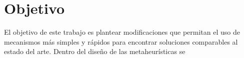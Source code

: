 \section{Objetivo}

El objetivo de este trabajo es plantear modificaciones que permitan el uso de mecanismos más simples y rápidos para encontrar soluciones comparables al estado del arte. Dentro del diseño de las metaheurísticas se 


